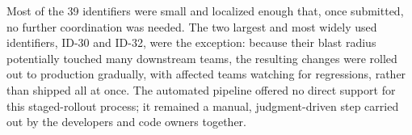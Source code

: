 Most of the 39 identifiers were small and localized enough that, once
submitted, no further coordination was needed. The two largest and
most widely used identifiers, ID-30 and ID-32, were the exception:
because their blast radius potentially touched many downstream teams,
the resulting changes were rolled out to production gradually, with
affected teams watching for regressions, rather than shipped all at
once. The automated pipeline offered no direct support for this
staged-rollout process; it remained a manual, judgment-driven step
carried out by the developers and code owners together.